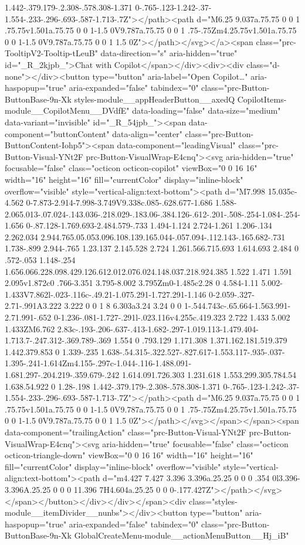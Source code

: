 {{1.442-.379.179-.2.308-.578.308-1.371 0-.765-.123-1.242-.37-1.554-.233-.296-.693-.587-1.713-.7Z"></path><path d="M6.25 9.037a.75.75 0 0 1 .75.75v1.501a.75.75 0 0 1-1.5 0V9.787a.75.75 0 0 1 .75-.75Zm4.25.75v1.501a.75.75 0 0 1-1.5 0V9.787a.75.75 0 0 1 1.5 0Z"></path></svg></a><span class="prc-TooltipV2-Tooltip-tLeuB" data-direction="s" aria-hidden="true" id="_R_2kjpb_">Chat with Copilot</span></div><div><div class="d-none"></div><button type="button" aria-label="Open Copilot…" aria-haspopup="true" aria-expanded="false" tabindex="0" class="prc-Button-ButtonBase-9n-Xk styles-module__appHeaderButton__axedQ CopilotItems-module__CopilotMenu__DVdfE" data-loading="false" data-size="medium" data-variant="invisible" id="_R_54jpb_"><span data-component="buttonContent" data-align="center" class="prc-Button-ButtonContent-Iohp5"><span data-component="leadingVisual" class="prc-Button-Visual-YNt2F prc-Button-VisualWrap-E4cnq"><svg aria-hidden="true" focusable="false" class="octicon octicon-copilot" viewBox="0 0 16 16" width="16" height="16" fill="currentColor" display="inline-block" overflow="visible" style="vertical-align:text-bottom"><path d="M7.998 15.035c-4.562 0-7.873-2.914-7.998-3.749V9.338c.085-.628.677-1.686 1.588-2.065.013-.07.024-.143.036-.218.029-.183.06-.384.126-.612-.201-.508-.254-1.084-.254-1.656 0-.87.128-1.769.693-2.484.579-.733 1.494-1.124 2.724-1.261 1.206-.134 2.262.034 2.944.765.05.053.096.108.139.165.044-.057.094-.112.143-.165.682-.731 1.738-.899 2.944-.765 1.23.137 2.145.528 2.724 1.261.566.715.693 1.614.693 2.484 0 .572-.053 1.148-.254 1.656.066.228.098.429.126.612.012.076.024.148.037.218.924.385 1.522 1.471 1.591 2.095v1.872c0 .766-3.351 3.795-8.002 3.795Zm0-1.485c2.28 0 4.584-1.11 5.002-1.433V7.862l-.023-.116c-.49.21-1.075.291-1.727.291-1.146 0-2.059-.327-2.71-.991A3.222 3.222 0 0 1 8 6.303a3.24 3.24 0 0 1-.544.743c-.65.664-1.563.991-2.71.991-.652 0-1.236-.081-1.727-.291l-.023.116v4.255c.419.323 2.722 1.433 5.002 1.433ZM6.762 2.83c-.193-.206-.637-.413-1.682-.297-1.019.113-1.479.404-1.713.7-.247.312-.369.789-.369 1.554 0 .793.129 1.171.308 1.371.162.181.519.379 1.442.379.853 0 1.339-.235 1.638-.54.315-.322.527-.827.617-1.553.117-.935-.037-1.395-.241-1.614Zm4.155-.297c-1.044-.116-1.488.091-1.681.297-.204.219-.359.679-.242 1.614.091.726.303 1.231.618 1.553.299.305.784.54 1.638.54.922 0 1.28-.198 1.442-.379.179-.2.308-.578.308-1.371 0-.765-.123-1.242-.37-1.554-.233-.296-.693-.587-1.713-.7Z"></path><path d="M6.25 9.037a.75.75 0 0 1 .75.75v1.501a.75.75 0 0 1-1.5 0V9.787a.75.75 0 0 1 .75-.75Zm4.25.75v1.501a.75.75 0 0 1-1.5 0V9.787a.75.75 0 0 1 1.5 0Z"></path></svg></span></span><span data-component="trailingAction" class="prc-Button-Visual-YNt2F prc-Button-VisualWrap-E4cnq"><svg aria-hidden="true" focusable="false" class="octicon octicon-triangle-down" viewBox="0 0 16 16" width="16" height="16" fill="currentColor" display="inline-block" overflow="visible" style="vertical-align:text-bottom"><path d="m4.427 7.427 3.396 3.396a.25.25 0 0 0 .354 0l3.396-3.396A.25.25 0 0 0 11.396 7H4.604a.25.25 0 0 0-.177.427Z"></path></svg></span></button></div></div></span><div class="styles-module__itemDivider__nunbs"></div><button type="button" aria-haspopup="true" aria-expanded="false" tabindex="0" class="prc-Button-ButtonBase-9n-Xk GlobalCreateMenu-module__actionMenuButton__Hj_iB" }}
